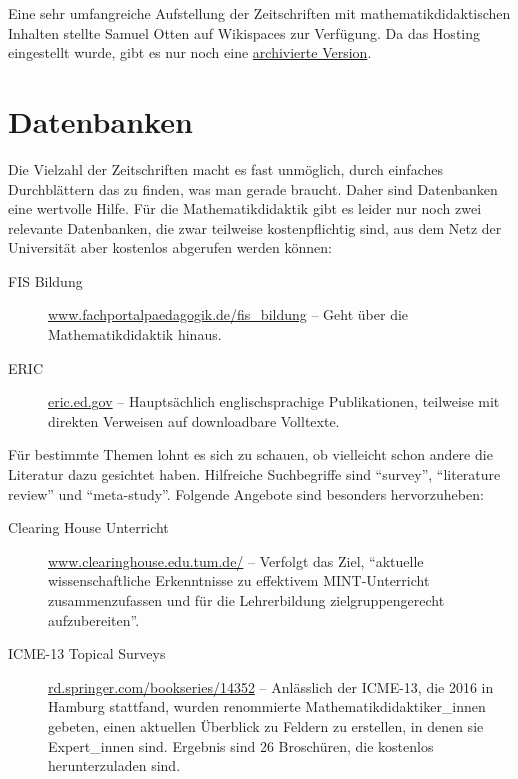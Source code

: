\documentclass[
  bibliography=totoc,
  oneside,
  12pt,
  a4paper]{scrbook}
\begin{document}
Eine sehr umfangreiche Aufstellung der Zeitschriften mit
mathematikdidaktischen Inhalten stellte Samuel Otten auf Wikispaces zur Verfügung. Da das Hosting eingestellt wurde, gibt es nur noch eine \href{https://web.archive.org/web/20180724110150/https://mathedjournals.wikispaces.com/}{archivierte Version}.

\hypertarget{datenbanken}{%
\section{Datenbanken}\label{datenbanken}}

Die Vielzahl der Zeitschriften macht es fast unmöglich, durch einfaches
Durchblättern das zu finden, was man gerade braucht. Daher sind
Datenbanken eine wertvolle Hilfe. Für die Mathematikdidaktik gibt es
leider nur noch zwei relevante Datenbanken, die zwar teilweise kostenpflichtig sind, aus
dem Netz der Universität aber kostenlos abgerufen werden können:

\begin{description}
\item[FIS Bildung]
\href{https://www.fachportal-paedagogik.de/}{www.fachportalpaedagogik.de/fis\_bildung} -- Geht über die
Mathematikdidaktik hinaus.
\item[ERIC]
\href{https://eric.ed.gov}{eric.ed.gov} -- Hauptsächlich englischsprachige Publikationen, teilweise mit direkten Verweisen auf downloadbare Volltexte.
\end{description}

Für bestimmte Themen lohnt es sich zu schauen, ob vielleicht schon andere die Literatur dazu gesichtet haben. Hilfreiche Suchbegriffe sind ``survey'', ``literature review'' und ``meta-study''. Folgende Angebote sind besonders hervorzuheben:

\begin{description}
\item[Clearing House Unterricht]
\href{https://www.clearinghouse.edu.tum.de/}{www.clearinghouse.edu.tum.de/} -- Verfolgt das Ziel, ``aktuelle wissenschaftliche Erkenntnisse zu effektivem MINT-Unterricht zusammenzufassen und für die Lehrerbildung zielgruppengerecht aufzubereiten''.
\item[ICME-13 Topical Surveys]
\href{https://rd.springer.com/bookseries/14352}{rd.springer.com/bookseries/14352} -- Anlässlich der ICME-13, die 2016 in Hamburg stattfand, wurden renommierte Mathematikdidaktiker\_innen gebeten, einen aktuellen Überblick zu Feldern zu erstellen, in denen sie Expert\_innen sind. Ergebnis sind 26 Broschüren, die kostenlos herunterzuladen sind.
\end{description}
\end{document}
